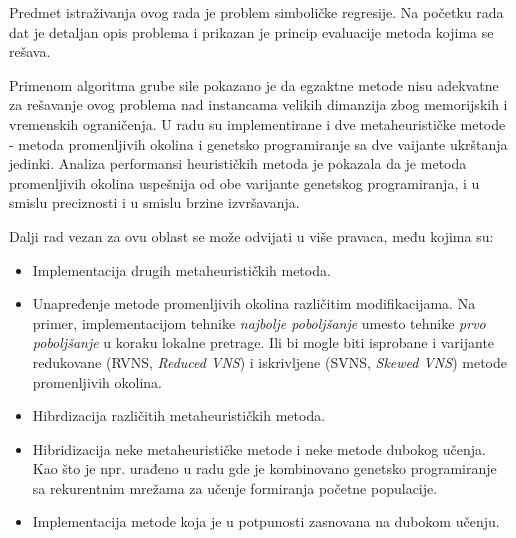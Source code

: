\documentclass[main.tex]{subfiles}
\begin{document}
Predmet istraživanja ovog rada je problem simboličke regresije. Na početku rada dat je detaljan opis problema i prikazan je princip evaluacije metoda kojima se rešava.

Primenom algoritma grube sile pokazano je da egzaktne metode nisu adekvatne za rešavanje ovog problema nad instancama velikih dimanzija zbog memorijskih i vremenskih ograničenja. U radu su implementirane i dve metaheurističke metode - metoda promenljivih okolina i genetsko programiranje sa dve vaijante ukrštanja jedinki. Analiza performansi heurističkih metoda je pokazala da je metoda promenljivih okolina uspešnija od obe varijante genetskog programiranja, i u smislu preciznosti i u smislu brzine izvršavanja.

Dalji rad vezan za ovu oblast se može odvijati u više pravaca, među kojima su:
\begin{itemize}
    \item Implementacija drugih metaheurističkih metoda.
    \item Unapređenje metode promenljivih okolina različitim modifikacijama. Na primer, implementacijom tehnike \textit{najbolje poboljšanje} umesto tehnike \textit{prvo poboljšanje} u koraku lokalne pretrage. Ili bi mogle biti isprobane i varijante redukovane (RVNS, \textit{Reduced VNS}) i iskrivljene (SVNS, \textit{Skewed VNS}) metode promenljivih okolina.
    \item Hibrdizacija različitih metaheurističkih metoda.
    \item Hibridizacija neke metaheurističke metode i neke metode dubokog učenja. Kao što je npr. urađeno u radu \cite{neuralGuidedGP} gde je kombinovano genetsko programiranje sa rekurentnim mrežama za učenje formiranja početne populacije.
    \item Implementacija metode koja je u potpunosti zasnovana na dubokom učenju.
\end{itemize}
\end{document}

